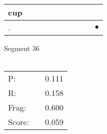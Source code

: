 \documentclass[landscape]{article}
\newcommand{\ssp}{\hspace{2pt}}
\newcommand{\mex}{\cellcolor{g}$\bullet$}
\begin{document}
\begin{tabular}{|l|p{10pt}|p{10pt}|p{10pt}|p{10pt}|p{10pt}|p{10pt}|p{10pt}|p{10pt}|p{10pt}|}
\hline
\ssp cup \ssp&\hspace{2pt}&\hspace{2pt}&\hspace{2pt}&\hspace{2pt}&\hspace{2pt}&\hspace{2pt}&\hspace{2pt}&\hspace{2pt}&\hspace{2pt}\\
\hline
\ssp \cellcolor{ref8}. \ssp&\hspace{2pt}&\hspace{2pt}&\hspace{2pt}&\hspace{2pt}&\hspace{2pt}&\hspace{2pt}&\hspace{2pt}&\hspace{2pt}&\hspace{2pt}\mex\\
\hline
\end{tabular}

\vspace{6pt}
\noindent Segment 36\\\\
\noindent\begin{tabular}{lm{12pt}r}
\hline
P:&&0.111\\
R:&&0.158\\
Frag:&&0.600\\
Score:&&0.059\\
\end{tabular}

\newpage
\end{document}
